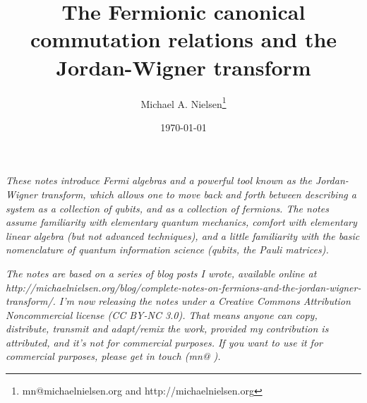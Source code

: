 \documentclass[12pt]{article}
\begin{document}
\title{The Fermionic canonical commutation relations and the
  Jordan-Wigner transform} 

\author{Michael A. Nielsen\thanks{mn@michaelnielsen.org and
    http://michaelnielsen.org} }

\date{\today}

\maketitle

\emph{These notes introduce Fermi algebras and a powerful tool known
  as the Jordan-Wigner transform, which allows one to move back and
  forth between describing a system as a collection of qubits, and as
  a collection of fermions.  The notes assume familiarity with
  elementary quantum mechanics, comfort with elementary linear algebra
  (but not advanced techniques), and a little familiarity with the
  basic nomenclature of quantum information science (qubits, the Pauli
  matrices).}

\emph{The notes are based on a series of blog posts I wrote, available
  online at
  http://michaelnielsen.org/blog/complete-notes-on-fermions-and-the-jordan-wigner-transform/.
  I'm now releasing the notes under a Creative Commons Attribution
  Noncommercial license (CC BY-NC 3.0).  That means anyone can copy,
  distribute, transmit and adapt/remix the work, provided my
  contribution is attributed, and it's not for commercial purposes.
  If you want to use it for commercial purposes, please get in touch
  (mn{\makeatletter @ \makeatother}).}


\end{document}
